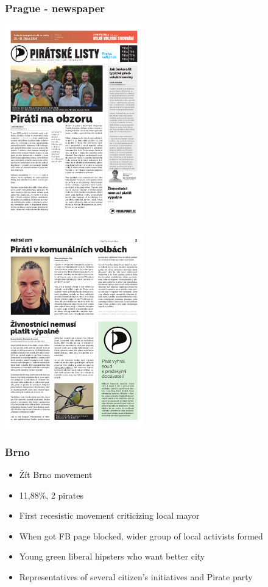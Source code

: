 \begin{frame}
	\frametitle{Prague - newspaper}
	\begin{center}
	\begin{multicols}{2}
		\includegraphics[width = 0.45\textwidth]{listy1.pdf}
		
		\includegraphics[width = 0.45\textwidth]{listy2.pdf}
	\end{multicols}
	\end{center}
\end{frame}
\begin{frame}
	\frametitle{Brno}
	\begin{itemize}
		\item \v{Z}\'it Brno movement
		\item 11,88\%, 2 pirates
		\item First recesistic movement criticizing local mayor
		\item When got FB page blocked, wider group of local activists formed
		\item Young green liberal hipsters who want better city
		\item Representatives of several citizen's initiatives and Pirate party
	\end{itemize}
\end{frame}
